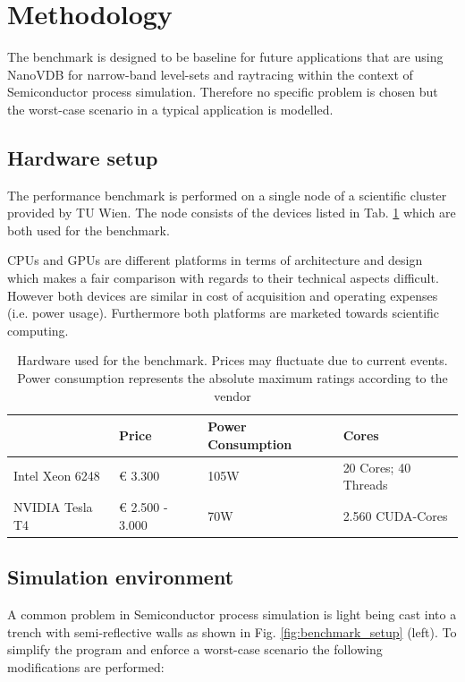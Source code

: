 \setcounter{section}{1}
\section{Methodology}


The benchmark is designed to be baseline for future applications that are using NanoVDB for narrow-band level-sets and raytracing within the context of Semiconductor process simulation.
Therefore no specific problem is chosen but the worst-case scenario in a typical application is modelled.

\subsection{Hardware setup}
The performance benchmark is performed on a single node of a scientific cluster provided by TU Wien.
The node consists of the devices listed in Tab. \ref{tab:hardware} which are both used for the benchmark.

CPUs and GPUs are different platforms in terms of architecture and design which makes a fair comparison with regards to their technical aspects difficult.
However both devices are similar in cost of acquisition and operating expenses (i.e. power usage).
Furthermore both platforms are marketed towards scientific computing.


\begin{table}[H]

	\caption{Hardware used for the benchmark. Prices may fluctuate due to current events. Power consumption represents the absolute maximum ratings according to the vendor}
	\centering
	\begin{tabular}{@{}llll@{}}
		\toprule
		                & Price           & Power Consumption & Cores                \\ \hline
		Intel Xeon 6248 & € 3.300         & 105W              & 20 Cores; 40 Threads \\
		NVIDIA Tesla T4 & € 2.500 - 3.000 & 70W               & 2.560 CUDA-Cores     \\ \bottomrule
	\end{tabular}
	\label{tab:hardware}
\end{table}


\subsection{Simulation environment}

A common problem in Semiconductor process simulation is light being cast into a trench with semi-reflective walls as shown in Fig. \ref{fig:benchmark_setup} (left).
To simplify the program and enforce a worst-case scenario the following modifications are performed:

